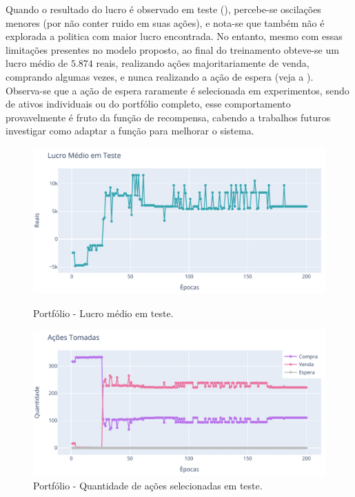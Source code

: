 
Quando o resultado do lucro é observado em teste (), percebe-se oscilações menores (por não conter ruido em suas ações), e nota-se que também não é explorada a politica com maior lucro encontrada. No entanto, mesmo com essas limitações presentes no modelo proposto, ao final do treinamento obteve-se um lucro médio de $5.874$ reais, realizando ações majoritariamente de venda, comprando algumas vezes, e nunca realizando a ação de espera (veja a ). Observa-se que a ação de espera raramente é selecionada em experimentos, sendo de ativos individuais ou do portfólio completo, esse comportamento provavelmente é fruto da função de recompensa, cabendo a trabalhos futuros investigar como adaptar a função para melhorar o sistema.

\begin{figure}[htbp]
    \centering 
    \begin{minipage}[b]{0.45\linewidth}
        \includegraphics[width=\linewidth]{img/ddpg/all/clean/profit}
        \caption{Portfólio - Lucro médio em teste.} 
        \label{all_clean_profit}
    \end{minipage}
    \quad
    \begin{minipage}[b]{0.45\linewidth}
        \includegraphics[width=\linewidth]{img/ddpg/all/clean/actions}
        \caption{Portfólio - Quantidade de ações selecionadas em teste.}
        \label{all_clean_act}
    \end{minipage}
\end{figure}

